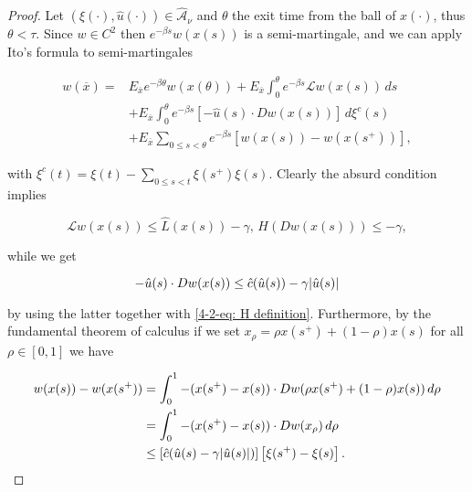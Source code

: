 \begin{theorem}
\begin{proof}
        Let $(\xi(\cdot),\hat{u}(\cdot))\in\hat{\mathcal{A}}_{\nu}$ and $\theta$ the exit time from the ball of $x(\cdot)$, thus $\theta<\tau$. Since $w\in C^2$ then $e^{-\beta s}w(x(s))$ is a semi-martingale, and we can apply Ito's formula to semi-martingales

        \begin{equation}\label{4-2-eq: first w in proof viscosity}
            \begin{aligned}
                w(\overline{x}) = & E_{\overline{x}} e^{-\beta \theta}w(x(\theta)) + E_{\overline{x}}\int_0^{\theta} e^{-\beta s}\mathcal{L}w(x(s))\,ds \\
                & + E_{\overline{x}}\int_0^{\theta} e^{-\beta s}\left[-\hat{u}(s)\cdot Dw(x(s))\right]\,d\xi^c(s) \\
                & + E_{\overline{x}} \sum_{0\leq s <\theta} e^{-\beta s}\left[w(x(s)) - w(x(s^+))\right],
            \end{aligned}
        \end{equation}   

        with $\xi^c(t) = \xi(t) - \sum_{0\leq s <t} \xi(s^+)\xi(s)$. Clearly the absurd condition implies

        \begin{equation}\label{4-2-eq: mathcal L hat L}
            \mathcal{L}w(x(s))\leq\hat{L}(x(s)) - \gamma,\, H(Dw(x(s)))\leq -\gamma,
        \end{equation}

        while we get

        \begin{equation}\label{4-2-eq: h cdot Dw leq gamma}
            -\hat{u}(s)\cdot Dw(x(s)) \leq \hat{c}(\hat{u}(s)) - \gamma\abs{\hat{u}(s)}
        \end{equation}

        by using the latter together with \eqref{4-2-eq: H definition}. Furthermore, by the fundamental theorem of calculus if we set $x_{\rho}=\rho x(s^+)+(1-\rho)x(s)$ for all $\rho\in[0,1]$ we have

        \begin{align*}
            w(x(s)) - w(x(s^+)) & = \int_0^1 -(x(s^+) - x(s))\cdot Dw(\rho x(s^+)+(1-\rho)x(s)) \,d\rho \\
            & = \int_0^1 -(x(s^+) - x(s))\cdot Dw(x_{\rho}) \,d\rho \\
            & \leq \left[\hat{c}(\hat{u}(s) - \gamma\abs{\hat{u}(s)})\right]\left[\xi(s^+) - \xi(s)\right].
        \end{align*}


\end{proof}
\end{theorem}
